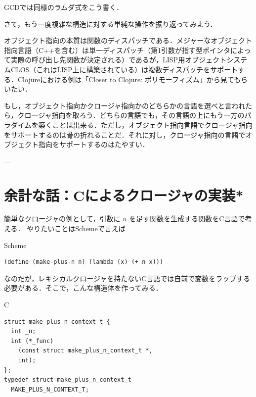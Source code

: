 \documentclass[a4paper,twocolumn]{jsbook}
\newcommand{\programminglanguage}[1]{\textsf{#1}}
\newcommand{\clang}{\programminglanguage{C}}
\newcommand{\scheme}{\programminglanguage{Scheme}}
\newenvironment{ccode}{\begin{itembox}[r]{\clang}}{\end{itembox}}
\newenvironment{schemecode}{\begin{itembox}[r]{\scheme}}{\end{itembox}}
\begin{document}

GCDでは同様のラムダ式をこう書く．


さて，もう一度複雑な構造に対する単純な操作を振り返ってみよう．

オブジェクト指向の本質は関数のディスパッチである．メジャーなオブジェクト指向言語（C++を含む）は単一ディスパッチ（第1引数が指す型ポインタによって実際の呼び出し先関数が決定される）であるが，LISP用オブジェクトシステムCLOS（これはLISP上に構築されている）は複数ディスパッチをサポートする．Clojureにおける例は「Closer to Clojure: ポリモーフィズム」から見てもらいたい．

もし，オブジェクト指向かクロージャ指向かのどちらかの言語を選べと言われたら，クロージャ指向を取ろう．どちらの言語でも，その言語の上にもう一方のパラダイムを築くことは出来る．ただし，オブジェクト指向言語でクロージャ指向をサポートするのは骨の折れることだ．それに対し，クロージャ指向の言語でオブジェクト指向をサポートするのはたやすい．

---

\section{余計な話：\clang によるクロージャの実装*}

簡単なクロージャの例として，引数に $n$ を足す関数を生成する関数を\clang 言語で考える．
やりたいことは\scheme で言えば
\begin{schemecode}
\begin{verbatim}
(define (make-plus-n n) (lambda (x) (+ n x)))
\end{verbatim}
\end{schemecode}
なのだが，レキシカルクロージャを持たない\clang 言語では自前で変数をラップする必要がある．そこで，こんな構造体を作ってみる．
\begin{ccode}
\begin{verbatim}
struct make_plus_n_context_t {
  int _n;
  int (*_func)
    (const struct make_plus_n_context_t *,
    int);
};
typedef struct make_plus_n_context_t
  MAKE_PLUS_N_CONTEXT_T;
\end{verbatim}
\end{ccode}
\end{document}

